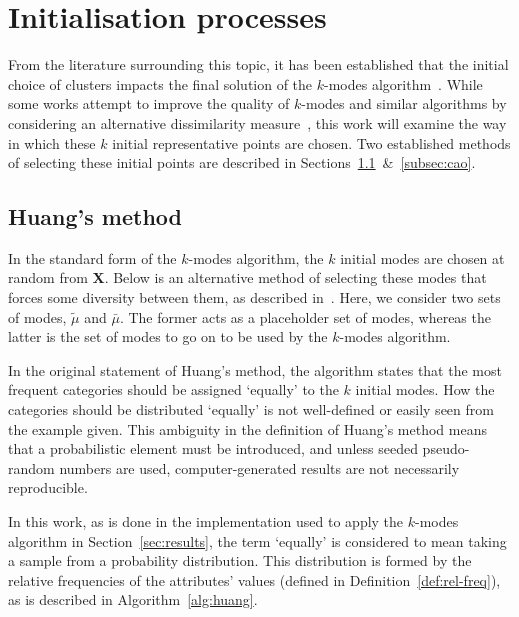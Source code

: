 \section{Initialisation processes}\label{sec:init}

From the literature surrounding this topic, it has been established that the 
initial choice of clusters impacts the final solution of the \(k\)-modes
algorithm~\cite{Cao2009, Huang1998}. While some works attempt to improve the
quality of \(k\)-modes and similar algorithms by considering an alternative 
dissimilarity measure~\cite{Ng2007}, this work will examine the way in which
these \(k\) initial representative points are chosen. Two established methods of 
selecting these initial points are described in
Sections~\ref{subsec:huang}~\&~\ref{subsec:cao}.


\subsection{Huang's method}\label{subsec:huang}

In the standard form of the \(k\)-modes algorithm, the \(k\) initial modes are 
chosen at random from \textbf{X}. Below is an alternative method of selecting
these modes that forces some diversity between them, as described 
in~\cite{Huang1998}. Here, we consider two sets of modes, \(\tilde{\mu}\) and
\(\bar{\mu}\). The former acts as a placeholder set of modes, whereas the latter
is the set of modes to go on to be used by the \(k\)-modes algorithm.



In the original statement of Huang's method, the algorithm states that the most
frequent categories should be assigned `equally' to the \(k\) initial modes. How
the categories should be distributed `equally' is not well-defined or easily
seen from the example given. This ambiguity in the definition of Huang's method
means that a probabilistic element must be introduced, and unless seeded
pseudo-random numbers are used, computer-generated results are not necessarily
reproducible.

In this work, as is done in the implementation used to apply the \(k\)-modes
algorithm in Section~\ref{sec:results}, the term `equally' is considered to mean
taking a sample from a probability distribution. This distribution is formed by
the relative frequencies of the attributes' values (defined in
Definition~\ref{def:rel-freq}), as is described in Algorithm~\ref{alg:huang}.

